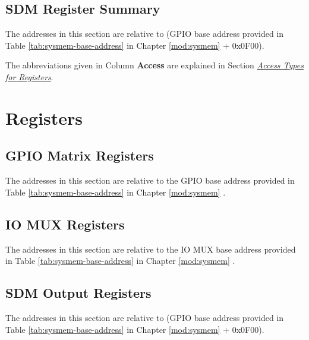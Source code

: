 \documentclass[main\_\_EN.tex]{subfiles}
\begin{document}
\subsection{SDM Register Summary}
The addresses in this section are relative to (GPIO base address provided in Table \ref{tab:sysmem-base-address} in Chapter \ref{mod:sysmem} \textit{} + 0x0F00).

The abbreviations given in Column \textbf{Access} are explained in Section \hyperref[glossary-access-types]{\textit{Access Types for Registers}}.




\section{Registers}

\subsection{GPIO Matrix Registers}
The addresses in this section are relative to the GPIO base address provided in Table \ref{tab:sysmem-base-address} in Chapter \ref{mod:sysmem} \textit{}.


\subsection{IO MUX Registers}
The addresses in this section are relative to the IO MUX base address provided in Table \ref{tab:sysmem-base-address} in Chapter \ref{mod:sysmem} \textit{}.


\subsection{SDM Output Registers}
The addresses in this section are relative to (GPIO base address provided in Table \ref{tab:sysmem-base-address} in Chapter \ref{mod:sysmem} \textit{} + 0x0F00).

\end{document}
